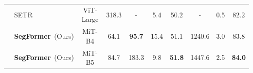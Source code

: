\begin{table}[]
{\begin{tabular}{l|c|c|c|ccc|ccc}
&\multicolumn{1}{l|}{SETR~\cite{setr}} & \multicolumn{1}{c|}{ViT-Large} & \multicolumn{1}{c|}{318.3} & - & 5.4 & \multicolumn{1}{c|}{50.2} & - & 0.5 & 82.2 \\ \cmidrule{2-10}%
&\multicolumn{1}{l|}{\textbf{SegFormer}~(Ours)} & \multicolumn{1}{c|}{MiT-B4} & \multicolumn{1}{c|}{64.1} & \textbf{95.7} & 15.4 & \multicolumn{1}{c|}{51.1} & 1240.6 & 3.0 & 83.8 \\
&\multicolumn{1}{l|}{\textbf{SegFormer}~(Ours)} & \multicolumn{1}{c|}{MiT-B5} & \multicolumn{1}{c|}{84.7} & 183.3 & 9.8 & \multicolumn{1}{c|}{\textbf{51.8}} & 1447.6 & 2.5 & \textbf{84.0} \\
\bottomrule
\end{tabular}
}
\vspace{-14pt}

\label{tab:sota1}
\end{table}
